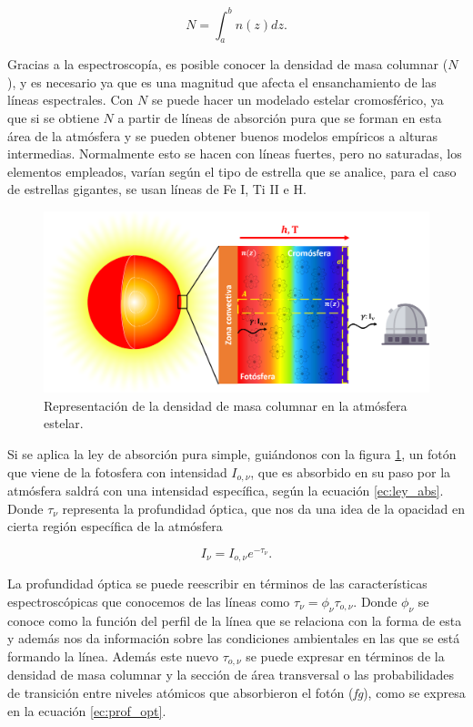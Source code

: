 \documentclass[12pt,oneside,openany,letter]{book}
\begin{document}
\begin{equation}
    N = \int_a^b n (z) dz.
    \label{ec:denscolumnar}
\end{equation}

\noindent Gracias a la espectroscopía, es posible conocer la densidad de masa columnar ($N$), y es necesario ya que es una magnitud que afecta el ensanchamiento de las líneas espectrales. Con $N$ se puede hacer un modelado estelar cromosférico, ya que si se obtiene $N$ a partir de líneas de absorción pura que se forman en esta área de la atmósfera y se pueden obtener buenos modelos empíricos a alturas intermedias. Normalmente esto se hacen con líneas fuertes, pero no saturadas, los elementos empleados, varían según el tipo de estrella que se analice, para el caso de estrellas gigantes, se usan líneas de Fe I, Ti II e H.

\begin{figure}[h]
    \centering
    \includegraphics[width=1\linewidth]{Images/densidad_masa (2).png}
    \caption{Representación de la densidad de masa columnar en la atmósfera estelar.}
    \label{fig:rep_dens_masa}
\end{figure}

Si se aplica la ley de absorción pura simple, guiándonos con la figura \ref{fig:rep_dens_masa}, un fotón que viene de la fotosfera con intensidad $I_{o, \nu}$, que es absorbido en su paso por la atmósfera saldrá con una intensidad específica, según la ecuación \ref{ec:ley_abs}. Donde $\tau_{\nu}$ representa la profundidad óptica, que nos da una idea de la opacidad en cierta región específica de la atmósfera \citep{carroll2017introduction}

\begin{equation}
    I_{\nu} = I_{o,\nu} e^{- \tau_{\nu}}.
    \label{ec:ley_abs}
\end{equation}

La profundidad óptica se puede reescribir en términos de las características espectroscópicas que conocemos de las líneas como $\tau_{\nu} = \phi_{\nu} \tau_{o, \nu}$. Donde $\phi_{\nu}$ se conoce como la función del perfil de la línea que se relaciona con la forma de esta y además nos da información sobre las condiciones ambientales en las que se está formando la línea. Además este nuevo $\tau_{o, \nu}$ se puede expresar en términos de la densidad de masa columnar y la sección de área transversal o las probabilidades de transición entre niveles atómicos que absorbieron el fotón (\textit{fg}), como se expresa en la ecuación \ref{ec:prof_opt}.
\end{document}
